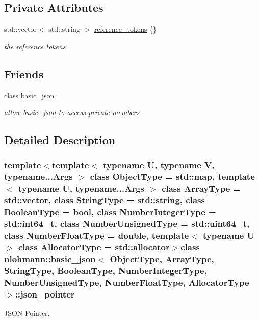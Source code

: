 \subsection*{Private Attributes}
\begin{DoxyCompactItemize}
\item 
std\+::vector$<$ std\+::string $>$ \hyperlink{classnlohmann_1_1basic__json_1_1json__pointer_a9c89f0314ddb85e5f40b1189bc3f1616}{reference\+\_\+tokens} \{\}
\begin{DoxyCompactList}\small\item\em the reference tokens \end{DoxyCompactList}\end{DoxyCompactItemize}
\subsection*{Friends}
\begin{DoxyCompactItemize}
\item 
class \hyperlink{classnlohmann_1_1basic__json_1_1json__pointer_ada3100cdb8700566051828f1355fa745}{basic\+\_\+json}
\begin{DoxyCompactList}\small\item\em allow \hyperlink{classnlohmann_1_1basic__json}{basic\+\_\+json} to access private members \end{DoxyCompactList}\end{DoxyCompactItemize}


\subsection{Detailed Description}
\subsubsection*{template$<$template$<$ typename U, typename V, typename...\+Args $>$ class Object\+Type = std\+::map, template$<$ typename U, typename...\+Args $>$ class Array\+Type = std\+::vector, class String\+Type = std\+::string, class Boolean\+Type = bool, class Number\+Integer\+Type = std\+::int64\+\_\+t, class Number\+Unsigned\+Type = std\+::uint64\+\_\+t, class Number\+Float\+Type = double, template$<$ typename U $>$ class Allocator\+Type = std\+::allocator$>$class nlohmann\+::basic\+\_\+json$<$ Object\+Type, Array\+Type, String\+Type, Boolean\+Type, Number\+Integer\+Type, Number\+Unsigned\+Type, Number\+Float\+Type, Allocator\+Type $>$\+::json\+\_\+pointer}

J\+S\+O\+N Pointer. 

